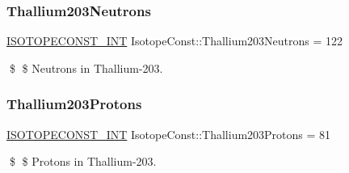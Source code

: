 \subsubsection{\texorpdfstring{Thallium203\+Neutrons}{Thallium203Neutrons}}
{\footnotesize\ttfamily \mbox{\hyperlink{group___isotope_const-_macros_ga5f18360b3e99483a35c32d789e62621c}{I\+S\+O\+T\+O\+P\+E\+C\+O\+N\+S\+T\+\_\+\+I\+NT}} Isotope\+Const\+::\+Thallium203\+Neutrons = 122}

\$ \$ Neutrons in Thallium-\/203. \mbox{\label{group___isotope_const-_thallium-_tl203_gae77d437e715e967bf05d30eed205eda8}} 
\subsubsection{\texorpdfstring{Thallium203\+Protons}{Thallium203Protons}}
{\footnotesize\ttfamily \mbox{\hyperlink{group___isotope_const-_macros_ga5f18360b3e99483a35c32d789e62621c}{I\+S\+O\+T\+O\+P\+E\+C\+O\+N\+S\+T\+\_\+\+I\+NT}} Isotope\+Const\+::\+Thallium203\+Protons = 81}

\$ \$ Protons in Thallium-\/203. 